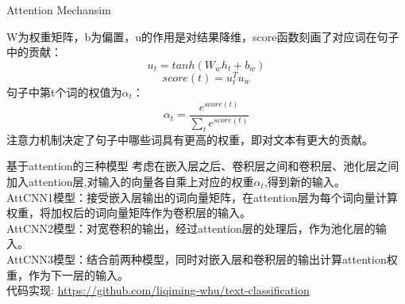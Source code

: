 \documentclass[serif]{beamer}
\begin{document}
\begin{frame}{Attention Mechansim}

	\qquad W为权重矩阵，b为偏置，u的作用是对结果降维，score函数刻画了对应词在句子中的贡献：
	\begin{equation*}
	u_{t}=tanh(W_{w}h_{t}+b_{w})
	\end{equation*}
	\begin{equation*}
	score(t)=u_{t}^{T}u_{w}
	\end{equation*}
	\qquad 句子中第t个词的权值为$\alpha_{t}$：
	\begin{equation*}
	\alpha_{t}=\frac{e^{score(t)}}{\sum_{t}e^{score(t)}}
	\end{equation*}
	\qquad 注意力机制决定了句子中哪些词具有更高的权重，即对文本有更大的贡献。

\end{frame}
\begin{frame}{基于attention的三种模型}
\qquad 考虑在嵌入层之后、卷积层之间和卷积层、池化层之间加入attention层,对输入的向量各自乘上对应的权重$\alpha_t$,得到新的输入。
\\[2ex]
\qquad AttCNN1模型：接受嵌入层输出的词向量矩阵，在attention层为每个词向量计算权重，将加权后的词向量矩阵作为卷积层的输入。
\\[2ex]
\qquad AttCNN2模型：对宽卷积的输出，经过attention层的处理后，作为池化层的输入。
\\[2ex]
\qquad AttCNN3模型：结合前两种模型，同时对嵌入层和卷积层的输出计算attention权重，作为下一层的输入。
\\[2ex]

\qquad 代码实现: \url{https://github.com/liqiming-whu/text-classification}
\end{frame}
\end{document}
